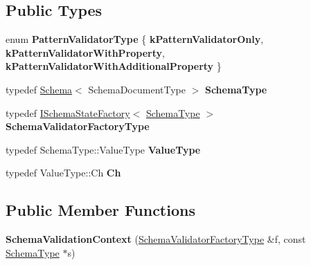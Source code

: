 \subsection*{Public Types}
\begin{DoxyCompactItemize}
\item 
\mbox{\label{structinternal_1_1SchemaValidationContext_a4fb1b8fe7ecb9d4608e6b0ac0716826c}} 
enum {\bfseries Pattern\+Validator\+Type} \{ {\bfseries k\+Pattern\+Validator\+Only}, 
{\bfseries k\+Pattern\+Validator\+With\+Property}, 
{\bfseries k\+Pattern\+Validator\+With\+Additional\+Property}
 \}
\item 
\mbox{\label{structinternal_1_1SchemaValidationContext_a79b155ab3711b97b6e33ced450614397}} 
typedef \hyperlink{classinternal_1_1Schema}{Schema}$<$ Schema\+Document\+Type $>$ {\bfseries Schema\+Type}
\item 
\mbox{\label{structinternal_1_1SchemaValidationContext_a33fa91fd8e880d1adb9b891fe441f110}} 
typedef \hyperlink{classinternal_1_1ISchemaStateFactory}{I\+Schema\+State\+Factory}$<$ \hyperlink{classinternal_1_1Schema}{Schema\+Type} $>$ {\bfseries Schema\+Validator\+Factory\+Type}
\item 
\mbox{\label{structinternal_1_1SchemaValidationContext_acc134e808d3a4dbe8834eb1a3e98e816}} 
typedef Schema\+Type\+::\+Value\+Type {\bfseries Value\+Type}
\item 
\mbox{\label{structinternal_1_1SchemaValidationContext_abd905cd1513b117f1db68b58d6c41daf}} 
typedef Value\+Type\+::\+Ch {\bfseries Ch}
\end{DoxyCompactItemize}
\subsection*{Public Member Functions}
\begin{DoxyCompactItemize}
\item 
\mbox{\label{structinternal_1_1SchemaValidationContext_a4adc8f66779626c9da4a56e7a87dcfac}} 
{\bfseries Schema\+Validation\+Context} (\hyperlink{classinternal_1_1ISchemaStateFactory}{Schema\+Validator\+Factory\+Type} \&f, const \hyperlink{classinternal_1_1Schema}{Schema\+Type} $\ast$s)
\end{DoxyCompactItemize}
